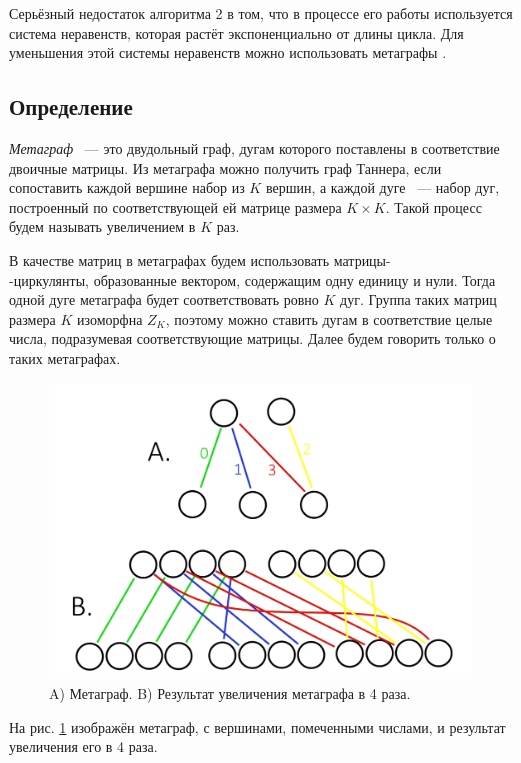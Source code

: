 \documentclass[14pt]{mmcs-article}
\begin{document}
Серьёзный недостаток алгоритма 2 в том, что в процессе его работы используется система неравенств, которая растёт экспоненциально от длины цикла. Для уменьшения этой системы неравенств можно использовать метаграфы \cite{metagraphs}.

\subsection{Определение}

\textsl{Метаграф} ~--- это двудольный граф, дугам которого поставлены в соответствие двоичные матрицы. Из метаграфа можно получить граф Таннера, если сопоставить каждой вершине набор из $K$ вершин, а каждой дуге ~--- набор дуг, построенный по соответствующей ей матрице размера $K \times K$. Такой процесс будем называть увеличением в $K$ раз. 

В качестве матриц в метаграфах будем использовать матрицы-\\-циркулянты, образованные вектором, содержащим одну единицу и нули. Тогда одной дуге метаграфа будет соответствовать ровно $K$ дуг. Группа таких матриц размера $K$ изоморфна $Z_K$, поэтому можно ставить дугам в соответствие целые числа, подразумевая соответствующие матрицы. Далее будем говорить только о таких метаграфах.

\begin{figure}[H]
  \centering
  \includegraphics[scale=0.35]{Fig_8.png}
  \caption{ A) Метаграф. B) Результат увеличения метаграфа в 4 раза. }
  \label{metagraph:1}
\end{figure}

На рис. \ref{metagraph:1} изображён метаграф, с вершинами, помеченными числами, и результат увеличения его в 4 раза.
\end{document}
